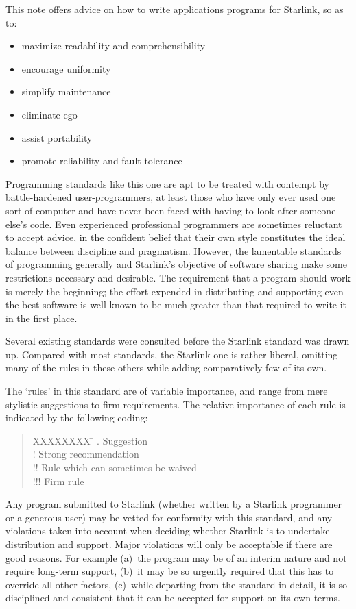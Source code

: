 \documentclass[twoside,11pt]{article}
\renewcommand{\_}{{\tt\char'137}}
\begin{document}
This note offers advice on how to write applications programs
for Starlink, so as to:
\begin{itemize}
\item maximize readability and comprehensibility
\item encourage uniformity
\item simplify maintenance
\item eliminate ego
\item assist portability
\item promote reliability and fault tolerance
\end{itemize}
Programming standards like this one are apt to be
treated with contempt by battle-hardened user-programmers,
at least those who have only
ever used one sort of computer and have never been faced with
having to look after someone else's code.  Even experienced professional
programmers are sometimes reluctant to accept advice, in the confident belief
that their own style constitutes the ideal balance between
discipline and pragmatism.
However, the lamentable standards of programming generally and Starlink's
objective of software sharing make some restrictions necessary and desirable.
The requirement that a program should work is merely
the beginning;  the effort expended in distributing and supporting even
the best software is well known to be much greater than that required to
write it in the first place.

Several existing standards were consulted before the Starlink
standard was drawn up.
Compared with most standards,
the Starlink one is rather liberal, omitting many of the rules in
these others while adding comparatively few of its own.

The `rules' in this standard are of variable importance, and range from mere
stylistic suggestions to firm requirements.
The relative importance of each rule is indicated by the following coding:
\begin{quote}
\begin{tabbing}
XXXXXXXX \= \kill
.   \> Suggestion \\
!   \> Strong recommendation \\
!!  \> Rule which can sometimes be waived \\
!!! \> Firm rule \\
\end{tabbing}
\end{quote}
Any program submitted to Starlink (whether written by a Starlink programmer or
a generous user) may be vetted for conformity with this standard, and any
violations taken into account when deciding whether Starlink is to undertake
distribution and support.
Major violations will only be acceptable if there are good reasons.
For example
(a)~the program may be of an interim nature and not require
long-term support,
(b)~it may be so urgently required that this has to override all other factors,
(c)~while departing from the standard in detail, it is so disciplined and
consistent that it can be accepted for support on its own terms.
\end{document}
